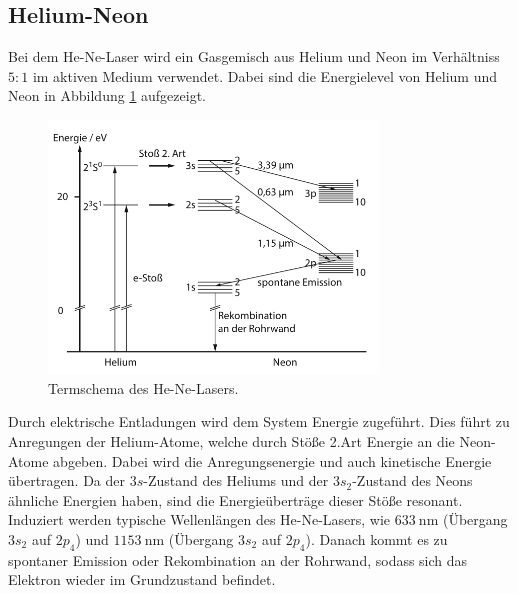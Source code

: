 \subsection{Helium-Neon}
Bei dem He-Ne-Laser wird ein Gasgemisch aus Helium und Neon im Verhältniss $5:1$ im aktiven Medium verwendet.
Dabei sind die Energielevel von Helium und Neon in Abbildung \ref{pic:hene} aufgezeigt. 
\begin{figure}
    \centering
    \includegraphics[width = 0.78\textwidth]{pics/HE-Ne_Termshema.png}
    \caption{Termschema des He-Ne-Lasers.\cite{Laser}}
    \label{pic:hene}
\end{figure}
Durch elektrische Entladungen wird dem System Energie zugeführt.
Dies führt zu Anregungen der Helium-Atome, welche durch Stöße 2.Art Energie an die Neon-Atome abgeben.
Dabei wird die Anregungsenergie und auch kinetische Energie übertragen.
Da der $3s$-Zustand des Heliums und der $3s_2$-Zustand des Neons ähnliche Energien haben, sind die Energieüberträge dieser Stöße resonant.
Induziert werden typische Wellenlängen des He-Ne-Lasers, wie $\SI{633}{\nano\meter}$ (Übergang $3s_2$ auf $2p_4$) und $\SI{1153}{\nano\meter}$ (Übergang $3s_2$ auf $2p_4$).
Danach kommt es zu spontaner Emission oder Rekombination an der Rohrwand, sodass sich das Elektron wieder im Grundzustand befindet.

